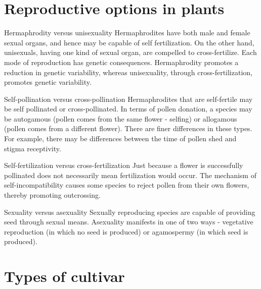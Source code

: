 \documentclass[11pt,ignorenonframetext,aspectratio=169]{beamer}
\begin{document}
\hypertarget{reproductive-options-in-plants}{%
\section{Reproductive options in
plants}\label{reproductive-options-in-plants}}

\begin{frame}{}
\protect\hypertarget{section-20}{}
\begin{block}{\footnotesize Hermaphrodity versus unisexuality}
\scriptsize
Hermaphrodites have both male and female sexual organs, and hence may be capable of self fertilization. On the other hand, unisexuals, having one kind of sexual organ, are compelled to cross-fertilize. Each mode of reproduction has genetic consequences. Hermaphrodity promotes a reduction in genetic variability, whereas unisexuality, through cross-fertilization, promotes genetic variability.
\end{block}

\begin{block}{\footnotesize Self-pollination versus cross-pollination}
\scriptsize
Hermaphrodites that are self-fertile may be self pollinated or cross-pollinated. In terms of pollen donation, a species may be autogamous (pollen comes from the same flower - selfing) or allogamous (pollen comes from a different flower). There are finer differences in these types. For example, there may be differences between the time of pollen shed and stigma receptivity.
\end{block}

\begin{block}{\footnotesize Self-fertilization versus cross-fertilization}
\scriptsize
Just because a flower is successfully pollinated does not necessarily mean fertilization would occur. The mechanism of self-incompatibility causes some species to reject pollen from their own flowers, thereby promoting outcrossing.
\end{block}

\begin{block}{\footnotesize Sexuality versus asexuality}
\scriptsize
Sexually reproducing species are capable of providing seed through sexual means. Asexuality manifests in one of two ways - vegetative reproduction (in which no seed is produced) or agamospermy (in which seed is produced).
\end{block}
\end{frame}

\hypertarget{types-of-cultivar}{%
\section{Types of cultivar}\label{types-of-cultivar}}
\end{document}

